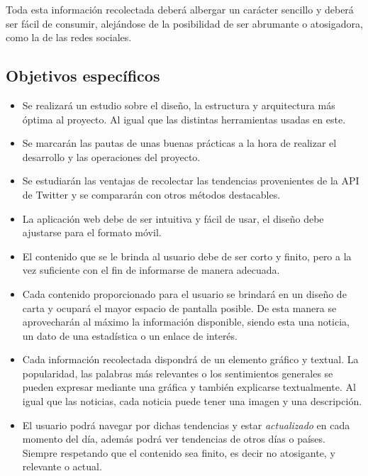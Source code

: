 \vspace{0.3cm}

Toda esta información recolectada deberá albergar un carácter sencillo y deberá ser fácil de consumir, alejándose de la posibilidad de ser abrumante o atosigadora, como la de las redes sociales.

\subsection{Objetivos específicos}

\begin{itemize}
\item Se realizará un estudio sobre el diseño, la estructura y arquitectura más óptima al proyecto. Al igual que las distintas herramientas usadas en este.
\item Se marcarán las pautas de unas buenas prácticas a la hora de realizar el desarrollo y las operaciones del proyecto.
\item Se estudiarán las ventajas de recolectar las tendencias provenientes de la API de Twitter y se compararán con otros métodos destacables.
\item La aplicación web debe de ser intuitiva y fácil de usar, el diseño debe ajustarse para el formato móvil.
\item El contenido que se le brinda al usuario debe de ser corto y finito, pero a la vez suficiente con el fin de informarse de manera adecuada.
\item Cada contenido proporcionado para el usuario se brindará en un diseño de carta y ocupará el mayor espacio de pantalla posible. De esta manera se aprovecharán al máximo la información disponible, siendo esta una noticia, un dato de una estadística o un enlace de interés.
\item Cada información recolectada dispondrá de un elemento gráfico y textual. La popularidad, las palabras más relevantes o los sentimientos generales se pueden expresar mediante una gráfica y también explicarse textualmente. Al igual que las noticias, cada noticia puede tener una imagen y una descripción.
\item El usuario podrá navegar por dichas tendencias y estar \textit{actualizado} en cada momento del día, además podrá ver tendencias de otros días o países. Siempre respetando que el contenido sea finito, es decir no atosigante, y relevante o actual.
\end{itemize}
